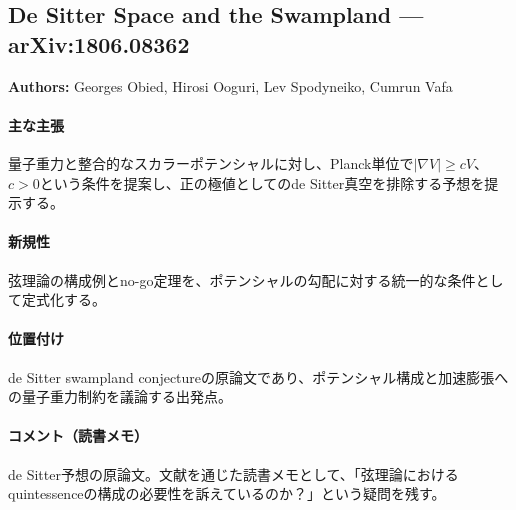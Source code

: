 \subsection{De Sitter Space and the Swampland --- arXiv:1806.08362}

\textbf{Authors:} Georges Obied, Hirosi Ooguri, Lev Spodyneiko, Cumrun Vafa

\paragraph{主な主張}
量子重力と整合的なスカラーポテンシャルに対し、Planck単位で$|\nabla V|\geq cV$、$c>0$という条件を提案し、正の極値としてのde Sitter真空を排除する予想を提示する\cite{Obied:2018sgi}。

\paragraph{新規性}
弦理論の構成例とno-go定理を、ポテンシャルの勾配に対する統一的な条件として定式化する。

\paragraph{位置付け}
de Sitter swampland conjectureの原論文であり、ポテンシャル構成と加速膨張への量子重力制約を議論する出発点。

\paragraph{コメント（読書メモ）}
de Sitter予想の原論文。文献\cite{Akrami:2018ylq}を通じた読書メモとして、「弦理論におけるquintessenceの構成の必要性を訴えているのか？」という疑問を残す。
